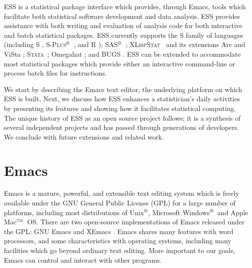 \documentclass{article}
\newcommand*{\regstrd}{$^{\mbox{\scriptsize{\textregistered}}}$}
\newcommand*{\tm}{$^{\mbox{\scriptsize\sc tm}}$}
\newcommand*{\SAS}{\textsc{SAS}}
\newcommand*{\Splus}{\textsc{S-Plus}}
\newcommand*{\XLispStat}{\textsc{XLispStat}}
\newcommand*{\Stata}{\textsc{Stata}}
\begin{document}
ESS is a statistical package interface which provides, through Emacs,
tools which facilitate both statistical software development and data
analysis.  ESS provides assistance with both writing and evaluation of
analysis code for both interactive and batch statistical
packages.  ESS currently supports the S family of languages (including
S \citep{BecRCW88,ChaJH92,ChaJ98}, \Splus\regstrd\ \citep{Splus}, and
R \citep{ihak:gent:1996}); \SAS\regstrd\ \citep{SAS:8}; \XLispStat\ 
\citep{Tier90} and its extensions Arc \citep{Cook:Weisberg:1999} and
ViSta \citep{youn:fald:mcfa:1992}; \Stata\ \citep{Stata:7.0}; Omegahat
\citep{DTLang:2000}; and BUGS \citep{BUGS}.  ESS can be extended to
accommodate most statistical packages which provide either an
interactive command-line or process batch files for instructions.

We start by describing the Emacs text editor, the underlying
platform on which ESS is built.  Next, we discuss how ESS enhances a
statistician's daily activities by presenting its features
and showing how it facilitates statistical computing.  The unique
history of ESS as an open source project follows; it is a
synthesis of several independent projects and has passed through 
generations of developers.  We conclude with future
extensions and related work.

\section{Emacs}
\label{sec:emacs}

Emacs is a mature, powerful, and extensible text editing system which
is freely available under the GNU General Public License (GPL) for a
large number of platforms, including most distributions of
Unix\regstrd, Microsoft Windows\regstrd\ and Apple Mac\tm\ OS.  There
are two open-source implementations of Emacs released
under the GPL: GNU Emacs \citep{GNU-Emacs} and XEmacs
\citep{XEmacs}.  Emacs shares many features with word processors, and
some characteristics with operating systems, including many facilities
which go beyond ordinary text editing.  More important to our goals,
Emacs can control and interact with other programs.
\end{document}
